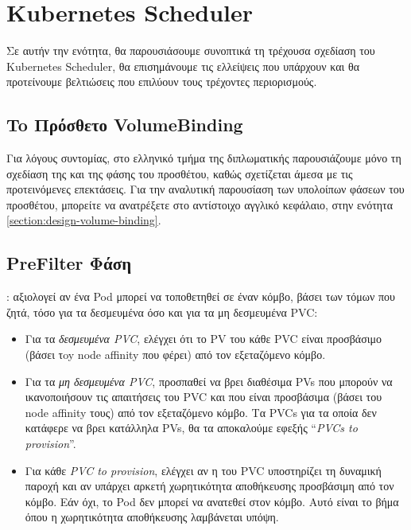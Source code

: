 \section{Kubernetes Scheduler}

Σε αυτήν την ενότητα, θα παρουσιάσουμε συνοπτικά τη τρέχουσα σχεδίαση του
Kubernetes Scheduler, θα επισημάνουμε τις ελλείψεις που υπάρχουν και θα
προτείνουμε βελτιώσεις που επιλύουν τους τρέχοντες περιορισμούς.

\subsection{To Πρόσθετο VolumeBinding}

Για λόγους συντομίας, στο ελληνικό τμήμα της διπλωματικής παρουσιάζουμε μόνο τη
σχεδίαση της  και της   φάσης του προσθέτου, καθώς
σχετίζεται άμεσα με τις προτεινόμενες επεκτάσεις. Για την αναλυτική παρουσίαση
των υπολοίπων φάσεων του προσθέτου, μπορείτε να ανατρέξετε στο αντίστοιχο
αγγλικό κεφάλαιο, στην ενότητα \ref{section:design-volume-binding}.

\subsection*{PreFilter Φάση}

: αξιολογεί αν ένα Pod μπορεί να τοποθετηθεί σε έναν κόμβο, βάσει των
τόμων που ζητά, τόσο για τα δεσμευμένα όσο και για τα μη δεσμευμένα PVC:
\begin{itemize}
      \tightlist
      \item Για τα \textit{δεσμευμένα PVC}, ελέγχει ότι το PV του κάθε PVC είναι
            προσβάσιμο (βάσει τoy node affinity που φέρει) από τον εξεταζόμενο
            κόμβο.
      \item Για τα \textit{μη δεσμευμένα PVC}, προσπαθεί να βρει διαθέσιμα PVs
            που μπορούν να ικανοποιήσουν τις απαιτήσεις του PVC και που είναι
            προσβάσιμα (βάσει του node affinity τους) από τον εξεταζόμενο κόμβο.
            Τα PVCs για τα οποία δεν κατάφερε να βρει κατάλληλα PVs, θα τα
            αποκαλούμε εφεξής ``\textit{PVCs to provision}''.
      \item Για κάθε \textit{PVC to provision}, ελέγχει αν η 
            του PVC υποστηρίζει τη δυναμική παροχή και αν υπάρχει αρκετή
            χωρητικότητα αποθήκευσης προσβάσιμη από τον κόμβο. Εάν όχι, το Pod
            δεν μπορεί να ανατεθεί στον κόμβο. Αυτό είναι το βήμα όπου
            η χωρητικότητα αποθήκευσης λαμβάνεται υπόψη.

\end{itemize}

